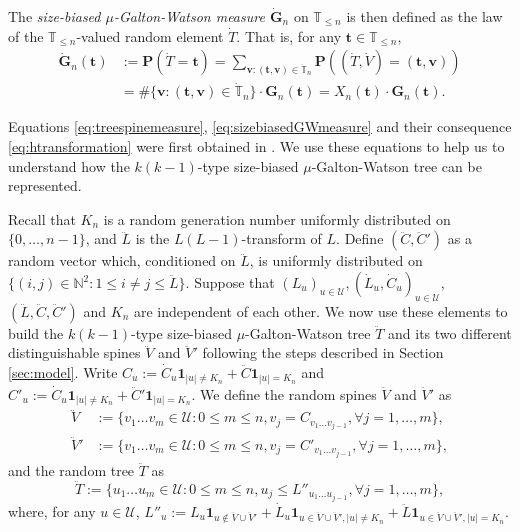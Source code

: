 \documentclass[12pt,a4paper]{amsart}
\numberwithin{equation}{section}
\begin{document}
	The \emph{size-biased $\mu$-Galton-Watson measure $\dot {\mathbf G}_n$} on $\mathbb T_{\leq n}$ is then defined as the law of the $\mathbb T_{\leq n}$-valued random element $\dot T$. That is, for any $ \mathbf t \in\mathbb T_{\leq n}$,
\begin{equation}
\label{eq:sizebiasedGWmeasure}
\begin{split}
		\dot {\mathbf G}_n( \mathbf t )
	&:= \mathbf P(\dot T= \mathbf t )
	= \sum_{ \mathbf v:( \mathbf t , \mathbf v)\in \dot{\mathbb T}_n} \mathbf P((\dot T,\dot V)=( \mathbf t , \mathbf v))
	\\&= \#\{ \mathbf v:( \mathbf t , \mathbf v)\in \dot{\mathbb T}_n\} \cdot \mathbf G_n( \mathbf t )
	= X_n( \mathbf t ) \cdot \mathbf G_n( \mathbf t ).
\end{split}
\end{equation}

	Equations \eqref{eq:treespinemeasure}, \eqref{eq:sizebiasedGWmeasure} and their consequence \eqref{eq:htransformation} were first obtained in \cite{lyons1995conceptual}.
	We use these equations to help us to understand how the $k(k-1)$-type size-biased $\mu$-Galton-Watson tree can be represented.
	
	Recall that $K_n$ is a random generation number uniformly distributed on $\{0,\dots,n-1\}$, and $\ddot L$ is the $L(L-1)$-transform of $L$.
	Define $(\ddot C,\ddot C')$ as a random vector which, conditioned on $\ddot L$, is uniformly distributed on $\{(i,j)\in\mathbb N^2:1\leq i\neq j\leq \ddot L\}$.
	Suppose that $(L_u)_{u\in\mathcal U}, (\dot L_u,\dot C_u)_{u\in \mathcal U}$, $(\ddot L,\ddot C,\ddot C')$ and $K_n$ are independent of each other.
	We now use these elements to build the $k(k-1)$-type size-biased $\mu$-Galton-Watson tree $\ddot T$ and its two different distinguishable spines $\ddot V$ and $\ddot V'$ following the steps described in Section \ref{sec:model}.
	Write $C_u:=\dot C_u\mathbf 1_{|u|\neq K_n}+\ddot C\mathbf 1_{|u|=K_n}$ and $C'_u:=\dot C_u\mathbf 1_{|u|\neq K_n}+\ddot C'\mathbf 1_{|u|=K_n}$.
	We define the random spines $\ddot V$ and $\ddot V'$ as
\begin{align*}
        \ddot V
	&:= \{v_1\dots v_m\in \mathcal U:0\le m\le n, v_j= C_{v_1\dots v_{j-1}},\forall j=1,\dots,m\},
	\\ \ddot V'
	&:= \{v_1\dots v_m\in \mathcal U:0\le m \le n, v_j= C'_{v_1\dots v_{j-1}},\forall j=1,\dots,m\},
\end{align*}
	and the random tree $\ddot T$ as
\begin{equation*}
	    \ddot T
	:=
		\{u_1\dots u_m\in\mathcal U: 0\le m\le n,u_j\leq L''_{u_1\dots u_{j-1}},\forall j=1,\dots,m\},
\end{equation*}
	where, for any $u\in\mathcal U$, $L''_u:=L_u \mathbf 1_{u\not\in \ddot V\cup\ddot V'}+\dot L_u \mathbf 1_{u\in \ddot V\cup\ddot V',|u|\neq K_n}+\ddot L\mathbf 1_{u\in \ddot V\cup\ddot V',|u|=K_n}$.
\end{document}
